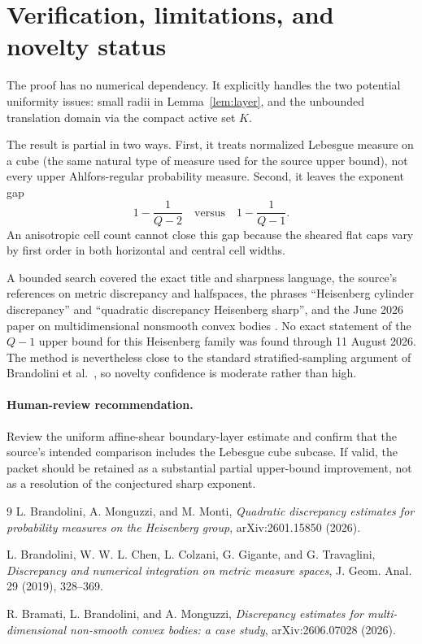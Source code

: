 \documentclass[11pt]{article}
\begin{document}
\section{Verification, limitations, and novelty status}

The proof has no numerical dependency.  It explicitly handles the two
potential uniformity issues: small radii in Lemma~\ref{lem:layer}, and the
unbounded translation domain via the compact active set \(K\).

The result is partial in two ways.  First, it treats normalized Lebesgue
measure on a cube (the same natural type of measure used for the source upper
bound), not every upper Ahlfors-regular probability measure.  Second, it leaves
the exponent gap
\[
 1-\frac1{Q-2}
 \quad\text{versus}\quad
 1-\frac1{Q-1}.
\]
An anisotropic cell count cannot close this gap because the sheared flat caps
vary by first order in both horizontal and central cell widths.

A bounded search covered the exact title and sharpness language, the source's
references on metric discrepancy and halfspaces, the phrases ``Heisenberg
cylinder discrepancy'' and ``quadratic discrepancy Heisenberg sharp'', and
the June 2026 paper on multidimensional nonsmooth convex bodies
\cite{BBM}.  No exact statement of the \(Q-1\) upper bound for this Heisenberg
family was found through 11 August 2026.  The method is nevertheless close to
the standard stratified-sampling argument of Brandolini et al.~\cite{BCCGT},
so novelty confidence is moderate rather than high.

\paragraph{Human-review recommendation.}
Review the uniform affine-shear boundary-layer estimate and confirm that the
source's intended comparison includes the Lebesgue cube subcase.  If valid,
the packet should be retained as a substantial partial upper-bound
improvement, not as a resolution of the conjectured sharp exponent.

\begin{thebibliography}{9}
L. Brandolini, A. Monguzzi, and M. Monti,
\emph{Quadratic discrepancy estimates for probability measures on the
Heisenberg group}, arXiv:2601.15850 (2026).

L. Brandolini, W. W. L. Chen, L. Colzani, G. Gigante, and G. Travaglini,
\emph{Discrepancy and numerical integration on metric measure spaces},
J. Geom. Anal. 29 (2019), 328--369.

R. Bramati, L. Brandolini, and A. Monguzzi,
\emph{Discrepancy estimates for multi-dimensional non-smooth convex bodies:
a case study}, arXiv:2606.07028 (2026).
\end{thebibliography}
\end{document}
